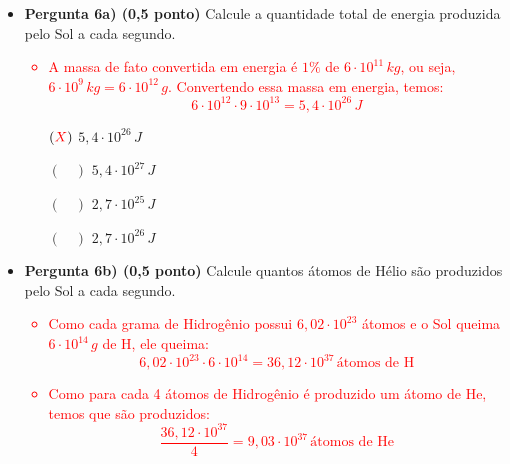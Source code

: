 \documentclass[a4paper, 12pt]{article}
\newcommand{\red}[1]{\textcolor{red}{#1}}
\begin{document}
\begin{flushleft}
\begin{itemize}
                \begin{itemize}
                    \item \textbf{Pergunta 6a) (0,5 ponto)} Calcule a quantidade total de energia produzida pelo Sol a cada segundo.
                        \red{\begin{itemize}
                            \item A massa de fato convertida em energia é $1\%$ de $6 \cdot 10^{11} \, kg$, ou seja, $6 \cdot 10^9 \, kg = 6 \cdot 10^{12} \, g$. Convertendo essa massa em energia, temos:
                                \begin{equation*}
                                    6 \cdot 10^{12} \cdot 9 \cdot 10^{13} = 5,4 \cdot 10^{26} \, J
                                \end{equation*}
                        \end{itemize}}
                        \begin{itemize}
                            \item[$(\red{X})$] $5,4 \cdot 10^{26} \, J$
                            \item[$(\quad)$] $5,4 \cdot 10^{27} \, J$
                            \item[$(\quad)$] $2,7 \cdot 10^{25} \, J$
                            \item[$(\quad)$] $2,7 \cdot 10^{26} \, J$
                        \end{itemize}
                    \item \textbf{Pergunta 6b) (0,5 ponto)} Calcule quantos átomos de Hélio são produzidos pelo Sol a cada segundo.
                        \red{\begin{itemize}
                            \item Como cada grama de Hidrogênio possui $6,02 \cdot 10^{23}$ átomos e o Sol queima $6 \cdot 10^{14} \, g$  de H, ele queima:
                                \begin{equation*}
                                    6,02 \cdot 10^{23} \cdot 6 \cdot 10^{14} = 36,12 \cdot 10^{37} \, \textrm{átomos de H}
                                \end{equation*}
                            \item Como para cada 4 átomos de Hidrogênio é produzido um átomo de He, temos que são produzidos:
                                \begin{equation*}
                                    \frac{36,12 \cdot 10^{37}}{4} = 9,03 \cdot 10^{37} \, \textrm{átomos de He}

\end{equation*}
\end{itemize}}
\end{itemize}
\end{itemize}
\end{flushleft}
\end{document}
